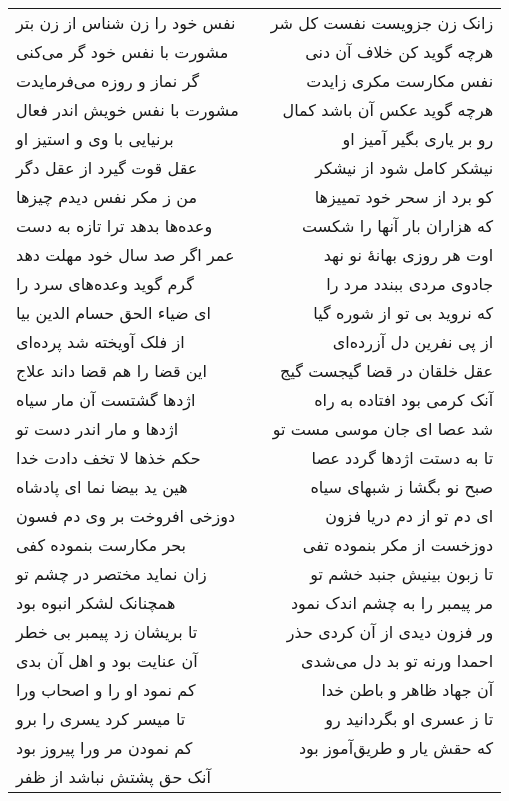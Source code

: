 \begin{center}
\begin{longtable}{l p{0.5cm} r}
\\
نفس خود را زن شناس از زن بتر
&&
زانک زن جزویست نفست کل شر
\\
مشورت با نفس خود گر می‌کنی
&&
هرچه گوید کن خلاف آن دنی
\\
گر نماز و روزه می‌فرمایدت
&&
نفس مکارست مکری زایدت
\\
مشورت با نفس خویش اندر فعال
&&
هرچه گوید عکس آن باشد کمال
\\
برنیایی با وی و استیز او
&&
رو بر یاری بگیر آمیز او
\\
عقل قوت گیرد از عقل دگر
&&
نیشکر کامل شود از نیشکر
\\
من ز مکر نفس دیدم چیزها
&&
کو برد از سحر خود تمییزها
\\
وعده‌ها بدهد ترا تازه به دست
&&
که هزاران بار آنها را شکست
\\
عمر اگر صد سال خود مهلت دهد
&&
اوت هر روزی بهانهٔ نو نهد
\\
گرم گوید وعده‌های سرد را
&&
جادوی مردی ببندد مرد را
\\
ای ضیاء الحق حسام الدین بیا
&&
که نروید بی تو از شوره گیا
\\
از فلک آویخته شد پرده‌ای
&&
از پی نفرین دل آزرده‌ای
\\
این قضا را هم قضا داند علاج
&&
عقل خلقان در قضا گیجست گیج
\\
اژدها گشتست آن مار سیاه
&&
آنک کرمی بود افتاده به راه
\\
اژدها و مار اندر دست تو
&&
شد عصا ای جان موسی مست تو
\\
حکم خذها لا تخف دادت خدا
&&
تا به دستت اژدها گردد عصا
\\
هین ید بیضا نما ای پادشاه
&&
صبح نو بگشا ز شبهای سیاه
\\
دوزخی افروخت بر وی دم فسون
&&
ای دم تو از دم دریا فزون
\\
بحر مکارست بنموده کفی
&&
دوزخست از مکر بنموده تفی
\\
زان نماید مختصر در چشم تو
&&
تا زبون بینیش جنبد خشم تو
\\
همچنانک لشکر انبوه بود
&&
مر پیمبر را به چشم اندک نمود
\\
تا بریشان زد پیمبر بی خطر
&&
ور فزون دیدی از آن کردی حذر
\\
آن عنایت بود و اهل آن بدی
&&
احمدا ورنه تو بد دل می‌شدی
\\
کم نمود او را و اصحاب ورا
&&
آن جهاد ظاهر و باطن خدا
\\
تا میسر کرد یسری را برو
&&
تا ز عسری او بگردانید رو
\\
کم نمودن مر ورا پیروز بود
&&
که حقش یار و طریق‌آموز بود
\\
آنک حق پشتش نباشد از ظفر

\end{longtable}
\end{center}
